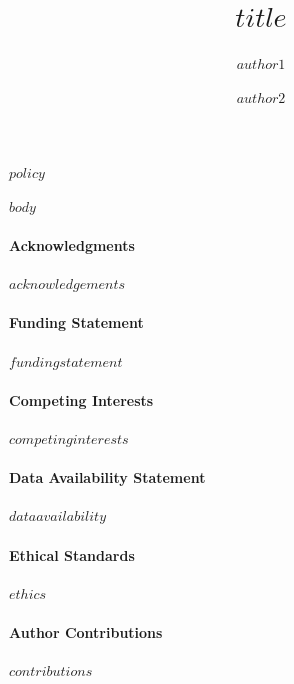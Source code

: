 \documentclass{latex/CUP-JNL-DAP}%
\begin{document}
\begin{Frontmatter}

\title[$title$]{$title$}

\author*[1]{$author1$}
\author[2]{ $author2$}


\address*[1]{, , }
\address[2]{}




\begin{policy}
$policy$
\end{policy}

\end{Frontmatter}

$body$

\begin{Backmatter}

\paragraph{Acknowledgments}
$acknowledgements$

\paragraph{Funding Statement}
$fundingstatement$

\paragraph{Competing Interests}
$competinginterests$

\paragraph{Data Availability Statement}
$dataavailability$

\paragraph{Ethical Standards}
$ethics$

\paragraph{Author Contributions}
$contributions$



% 


\end{Backmatter}
\end{document}
